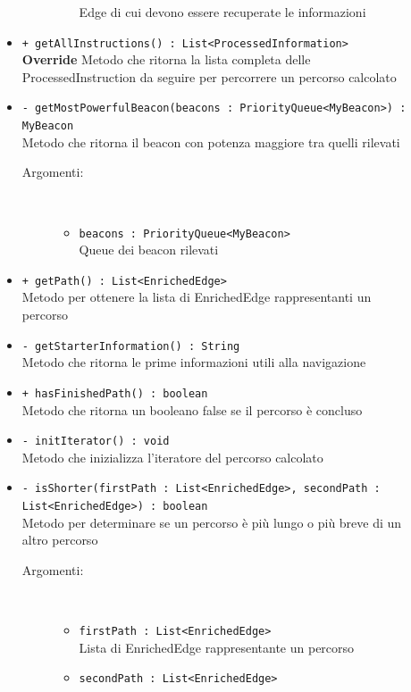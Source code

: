 \documentclass[../DefinizioneDiProdotto.tex]{subfiles}
\begin{document}
\begin{description}
\begin{itemize}
\begin{description}
\begin{itemize}
				Edge di cui devono essere recuperate le informazioni\end{itemize}
		\end{description}
		\item \texttt{+ getAllInstructions() : List<ProcessedInformation>}\\
		\textbf{Override} Metodo che ritorna la lista completa delle ProcessedInstruction da seguire per percorrere un percorso calcolato
		\item \texttt{- getMostPowerfulBeacon(beacons : PriorityQueue<MyBeacon>) : MyBeacon}\\
		Metodo che ritorna il beacon con potenza maggiore tra quelli rilevati
		\begin{description}
			\item[Argomenti:] \
			\begin{itemize}
				\item \texttt{beacons : PriorityQueue<MyBeacon>}\\
				Queue dei beacon rilevati\end{itemize}
		\end{description}
		\item \texttt{+ getPath() : List<EnrichedEdge>}\\
		Metodo per ottenere la lista di EnrichedEdge rappresentanti un percorso
		\item \texttt{- getStarterInformation() : String}\\
		Metodo che ritorna le prime informazioni utili alla navigazione
		\item \texttt{+ hasFinishedPath() : boolean}\\
		Metodo che ritorna un booleano false se il percorso è concluso
		\item \texttt{- initIterator() : void}\\
		Metodo che inizializza l'iteratore del percorso calcolato
		\item \texttt{- isShorter(firstPath : List<EnrichedEdge>, secondPath : List<EnrichedEdge>) : boolean}\\
		Metodo per determinare se un percorso è più lungo o più breve di un altro percorso
		\begin{description}
			\item[Argomenti:] \
			\begin{itemize}
				\item \texttt{firstPath : List<EnrichedEdge>}\\
				Lista di EnrichedEdge rappresentante un percorso\item \texttt{secondPath : List<EnrichedEdge>}\\

\end{itemize}
\end{description}
\end{itemize}
\end{description}
\end{document}
